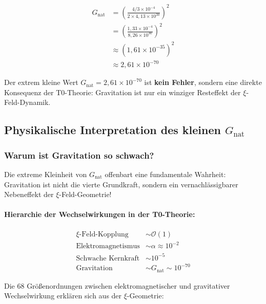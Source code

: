 \documentclass[12pt,a4paper]{article}
\theoremstyle{definition}
\begin{document}
\begin{align}
	G_{\text{nat}} &= \left( \frac{4/3 \times 10^{-4}}{2 \times 4{,}13 \times 10^{30}} \right)^2 \\
	&= \left( \frac{1{,}33 \times 10^{-4}}{8{,}26 \times 10^{30}} \right)^2 \\
	&\approx \left( 1{,}61 \times 10^{-35} \right)^2 \\
	&\approx 2{,}61 \times 10^{-70}
\end{align}

\begin{important}
	Der extrem kleine Wert $G_{\text{nat}} = 2{,}61 \times 10^{-70}$ ist \textbf{kein Fehler}, sondern eine direkte Konsequenz der T0-Theorie: Gravitation ist nur ein winziger Resteffekt der $\xi$-Feld-Dynamik.
\end{important}

\subsection{Physikalische Interpretation des kleinen $G_{\text{nat}}$}

\subsubsection{Warum ist Gravitation so schwach?}

\begin{revolutionary}
	Die extreme Kleinheit von $G_{\text{nat}}$ offenbart eine fundamentale Wahrheit: Gravitation ist nicht die vierte Grundkraft, sondern ein vernachlässigbarer Nebeneffekt der $\xi$-Feld-Geometrie!
\end{revolutionary}

\paragraph{Hierarchie der Wechselwirkungen in der T0-Theorie:}
\begin{align}
	\xi\text{-Feld-Kopplung} &\sim \mathcal{O}(1) \\
	\text{Elektromagnetismus} &\sim \alpha \approx 10^{-2} \\
	\text{Schwache Kernkraft} &\sim 10^{-5} \\
	\text{Gravitation} &\sim G_{\text{nat}} \sim 10^{-70}
\end{align}

Die 68 Größenordnungen zwischen elektromagnetischer und gravitativer Wechselwirkung erklären sich aus der $\xi$-Geometrie:
\end{document}
